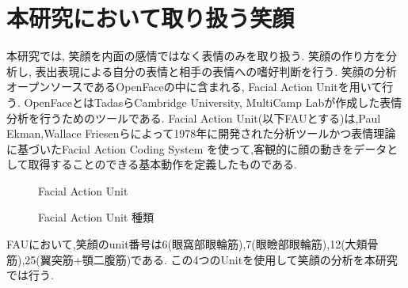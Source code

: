 \section{本研究において取り扱う笑顔}
本研究では, 笑顔を内面の感情ではなく表情のみを取り扱う. 笑顔の作り方を分析し, 表出表現による自分の表情と相手の表情への嗜好判断を行う.
笑顔の分析オープンソースであるOpenFaceの中に含まれる, Facial Action Unitを用いて行う.
OpenFaceとはTadasらCambridge University, MultiCamp Labが作成した表情分析を行うためのツールである.
Facial Action Unit(以下FAUとする)は,Paul Ekman,Wallace Friesenらによって1978年に開発された分析ツールかつ表情理論に基づいたFacial Action Coding System
を使って,客観的に顔の動きをデータとして取得することのできる基本動作を定義したものである.
\begin{figure}[htbp]
    \begin{center}
    \end{center}
    \caption{Facial Action Unit}
    \label{fig:faus}
    \end{figure}

    \begin{figure}[htbp]
        \begin{center}
        \end{center}
        \caption{Facial Action Unit 種類}
        \label{fig:faus2}
        \end{figure}
  FAUにおいて,笑顔のunit番号は6(眼窩部眼輪筋),7(眼瞼部眼輪筋),12(大頬骨筋),25(翼突筋+顎二腹筋)である.
  この4つのUnitを使用して笑顔の分析を本研究では行う.
